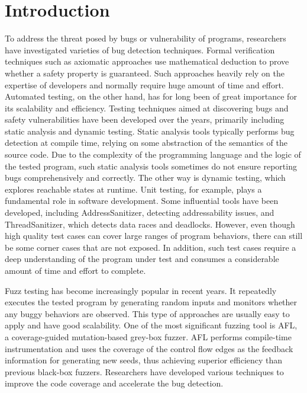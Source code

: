 \chapter{\label{cha:intro}Introduction}


To address the threat posed by bugs or vulnerability of programs, researchers have investigated varieties of bug detection techniques. Formal verification techniques such as axiomatic approaches use mathematical deduction to prove whether a safety property is guaranteed. Such approaches heavily rely on the expertise of developers and normally require huge amount of time and effort. %
Automated testing, on the other hand, has for long been of great importance for its scalability and efficiency. Testing techniques aimed at discovering bugs and safety vulnerabilities have been developed over the years, primarily including static analysis and dynamic testing. Static analysis tools typically performs bug detection at compile time, relying on some abstraction of the semantics of the source code. %
Due to the complexity of the programming language and the logic of the tested program, such static analysis tools sometimes do not ensure reporting bugs comprehensively and correctly. The other way is dynamic testing, which explores reachable states at runtime. Unit testing, for example, plays a fundamental role in software development. Some influential tools have been developed, including AddressSanitizer, detecting addressability issues, and ThreadSanitizer, which detects data races and deadlocks. However, even though high quality test cases can cover large ranges of program behaviors, there can still be some corner cases that are not exposed. In addition, such test cases require a deep understanding of the program under test and consumes a considerable amount of time and effort to complete. 


Fuzz testing has become increasingly popular in recent years. It repeatedly executes the tested program by generating random inputs and monitors whether any buggy behaviors are observed. This type of approaches are usually easy to apply and have good scalability. One of the most significant fuzzing tool is AFL, a coverage-guided mutation-based grey-box fuzzer. AFL performs compile-time instrumentation and uses the coverage of the control flow edges as the feedback information for generating new seeds, thus achieving superior efficiency than previous black-box fuzzers. Researchers have developed various techniques to improve the code coverage and accelerate the bug detection. %

